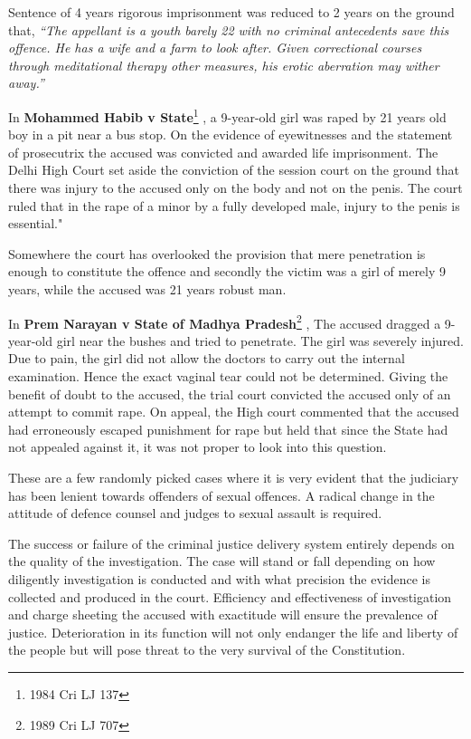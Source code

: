 \begin{multicols}{2}
\noi
Sentence of 4 years rigorous imprisonment was reduced to 2 years on the ground that,
\textit{“The appellant is a youth barely 22 with no criminal antecedents save this offence. He
has a wife and a farm to look after. Given correctional courses through meditational
therapy other measures, his erotic aberration may wither away.”}

\noi
In \textbf{Mohammed Habib v State}\footnote{1984 Cri LJ 137}
, a 9-year-old girl was raped by 21 years old boy in a
pit near a bus stop. On the evidence of eyewitnesses and the statement of prosecutrix
the accused was convicted and awarded life imprisonment. The Delhi High Court set
aside the conviction of the session court on the ground that there was injury to the
accused only on the body and not on the penis. The court ruled that in the rape of a
minor by a fully developed male, injury to the penis is essential."

\noi
Somewhere the court has overlooked the provision that mere penetration is enough to
constitute the offence and secondly the victim was a girl of merely 9 years, while the
accused was 21 years robust man.

\noi
In \textbf{Prem Narayan v State of Madhya Pradesh}\footnote{1989 Cri LJ 707}
, The accused dragged a 9-year-old
girl near the bushes and tried to penetrate. The girl was severely injured. Due to pain,
the girl did not allow the doctors to carry out the internal examination. Hence the exact
vaginal tear could not be determined. Giving the benefit of doubt to the accused, the
trial court convicted the accused only of an attempt to commit rape. On appeal, the High
court commented that the accused had erroneously escaped punishment for rape but
held that since the State had not appealed against it, it was not proper to look into this
question.

\noi
These are a few randomly picked cases where it is very evident that the judiciary has
been lenient towards offenders of sexual offences. A radical change in the attitude of
defence counsel and judges to sexual assault is required.


\noi
The success or failure of the criminal justice delivery system entirely depends on the
quality of the investigation. The case will stand or fall depending on how diligently
investigation is conducted and with what precision the evidence is collected and
produced in the court. Efficiency and effectiveness of investigation and charge sheeting
the accused with exactitude will ensure the prevalence of justice. Deterioration in its
function will not only endanger the life and liberty of the people but will pose threat to
the very survival of the Constitution.


\end{multicols}
